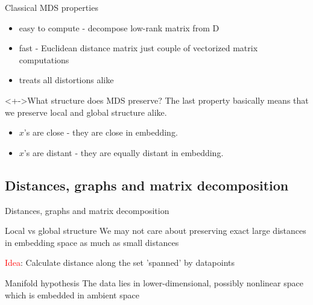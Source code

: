 \documentclass[unknownkeysallowed]{beamer}
\begin{document}
\begin{frame}{Classical MDS properties}

	\begin{itemize}[<+->]
		\item easy to compute - decompose low-rank matrix from D
		\item fast - Euclidean distance matrix just couple of vectorized matrix computations
		\item treats all distortions alike
	\end{itemize}



	\begin{block}<+->{What structure does MDS preserve?}
	The last property basically means that we preserve local and global structure alike.

	\begin{itemize}
		\item $x$'s are close - they are close in embedding.
		\item $x$'s are distant - they are equally distant in embedding.
	\end{itemize}

	\end{block}
\end{frame}
\subsection{Distances, graphs and matrix decomposition}

\begin{frame}{Distances, graphs and matrix decomposition}

	\begin{block}{Local vs global structure}
	We may not care about preserving exact large distances in embedding space as much as small distances

	\textcolor{red}{Idea}: Calculate distance along the set 'spanned' by datapoints
	\end{block}

	\begin{block}{Manifold hypothesis}
	The data lies in lower-dimensional, possibly nonlinear space which is embedded in ambient space
	\end{block}



\end{frame}
\end{document}
